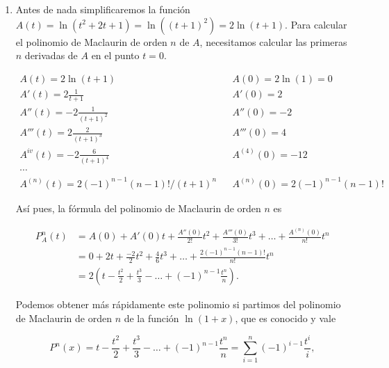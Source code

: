\documentclass[
  spanish,
  a4paper,
]{scrreport}
\theoremstyle{definition}
\theoremstyle{remark}
\begin{document}
\begin{tcolorbox}[enhanced jigsaw, arc=.35mm, bottomrule=.15mm, bottomtitle=1mm, breakable, colback=white, colbacktitle=quarto-callout-tip-color!10!white, colframe=quarto-callout-tip-color-frame, coltitle=black, left=2mm, leftrule=.75mm, opacityback=0, opacitybacktitle=0.6, rightrule=.15mm, title=\textcolor{quarto-callout-tip-color}{\faLightbulb}\hspace{0.5em}{Solución}, titlerule=0mm, toprule=.15mm, toptitle=1mm]

\begin{enumerate}
\def\labelenumi{\alph{enumi}.}
\item
  Antes de nada simplificaremos la función
  \(A(t) = \ln(t^2 + 2t + 1) = \ln((t+1)^2) = 2\ln(t+1)\). Para calcular
  el polinomio de Maclaurin de orden \(n\) de \(A\), necesitamos
  calcular las primeras \(n\) derivadas de \(A\) en el punto \(t=0\).

  \[
  \begin{array}{lll}
  A(t) = 2\ln(t+1) & & A(0) = 2\ln(1) = 0 \\
  A'(t) = 2\frac{1}{t+1} & & A'(0) = 2 \\
  A''(t) = -2\frac{1}{(t+1)^2} & & A''(0) = -2 \\
  A'''(t) = 2\frac{2}{(t+1)^3} & & A'''(0) = 4 \\
  A^{iv}(t) = -2\frac{6}{(t+1)^4} & & A^{(4)}(0) = -12 \\
  \cdots \\
  A^{(n)}(t) = 2(-1)^{n-1} (n-1)!/(t+1)^n & & A^{(n)}(0) = 2(-1)^{n-1} (n-1)!
  \end{array}
  \]

  Así pues, la fórmula del polinomio de Maclaurin de orden \(n\) es

  \begin{align*}
  P_A^n(t) 
  &= A(0) + A'(0) t + \frac{A''(0)}{2!} t^2 + \frac{A'''(0)}{3!} t^3 + \ldots + \frac{A^{(n)}(0)}{n!} t^n \\
  &= 0 + 2t + \frac{-2}{2} t^2 + \frac{4}{6} t^3 + \ldots + \frac{2(-1)^{n-1} (n-1)!}{n!} t^n \\
  &= 2(t - \frac{t^2}{2} + \frac{t^3}{3} - \ldots + (-1)^{n-1}\frac{t^n}{n}).
  \end{align*}

  Podemos obtener más rápidamente este polinomio si partimos del
  polinomio de Maclaurin de orden \(n\) de la función \(\ln(1+x)\), que
  es conocido y vale

  \[
  P^n(x) = t - \frac{t^2}{2} + \frac{t^3}{3} - \ldots + (-1)^{n-1}\frac{t^n}{n} = \sum_{i=1}^{n} (-1)^{i-1} \frac{t^i}{i},
  \]


\end{enumerate}
\end{tcolorbox}
\end{document}
